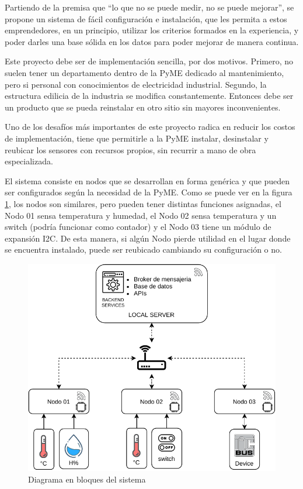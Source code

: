 \documentclass[11pt]{charter}
\begin{document}
Partiendo de la premisa que “lo que no se puede medir, no se puede mejorar”, se propone un sistema de fácil configuración e instalación, que les permita a estos emprendedores, en un principio, utilizar los criterios formados en la experiencia, y poder darles una base sólida en los datos para poder mejorar de manera continua.

Este proyecto debe ser de implementación sencilla, por dos motivos. Primero, no suelen tener un departamento dentro de la PyME dedicado al mantenimiento, pero si personal con conocimientos de electricidad industrial. Segundo, la estructura edilicia de la industria se modifica constantemente. Entonces debe ser un producto que se pueda reinstalar en otro sitio sin mayores inconvenientes.

Uno de los desafíos más importantes de este proyecto radica en reducir los costos de implementación, tiene que permitirle a la PyME instalar, desinstalar y reubicar los sensores con recursos propios, sin recurrir a mano de obra especializada.

El sistema consiste en nodos que se desarrollan en forma genérica y que pueden ser configurados según la necesidad de la PyME. Como se puede ver en la figura \ref{fig:diagBloques}, los nodos son similares, pero pueden tener distintas funciones asignadas, el Nodo 01 sensa temperatura y humedad, el Nodo 02 sensa temperatura y un switch (podría funcionar como contador) y el Nodo 03 tiene un módulo de expansión I2C. De esta manera, si algún Nodo pierde utilidad en el lugar donde se encuentra instalado, puede ser reubicado cambiando su configuración o no.


\vspace{10px}

\begin{figure}[htpb]
\centering 
\includegraphics[width=.68\textwidth]{./Figuras/DiagramaEnBloques.pdf}
\caption{Diagrama en bloques del sistema}
\label{fig:diagBloques}
\end{figure}
\end{document}
